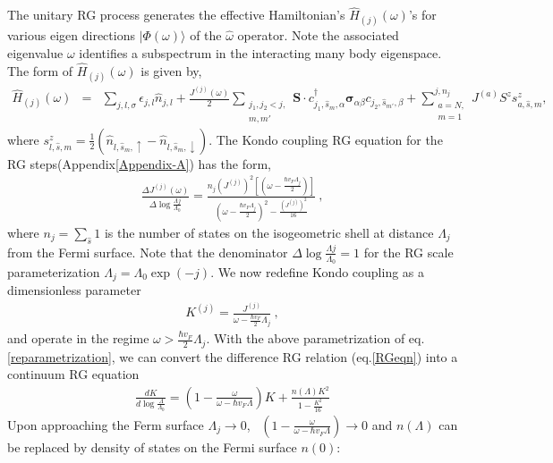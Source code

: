 \documentclass[aps,prb,preprint,groupedaddress]{revtex4-2}
\begin{document}
The unitary RG process generates the effective Hamiltonian's $\hat{H}_{(j)}(\omega)$'s for various eigen directions $|\Phi(\omega)\rangle$
of the $\hat{\omega}$ operator. Note the associated eigenvalue $\omega$ identifies a subspectrum in the interacting many body eigenspace. The form of $\hat{H}_{(j)}(\omega)$ is given by,
\begin{eqnarray}
\hat{H}_{(j)}(\omega) &=& \sum_{j,l,\sigma}\epsilon_{j,l}\hat{n}_{j,l}+\frac{J^{(j)}(\omega)}{2}\sum_{\substack{j_{1},j_{2}<j,\\ m,m'}}\mathbf{S}\cdot c^{\dagger}_{j_{1},\hat{s}_{m},\alpha}\boldsymbol{\sigma}_{\alpha\beta}c_{j_{2},\hat{s}_{m'},\beta}+\sum^{j,n_{j}}_{\substack{a=N,\\ m=1}}J^{(a)}S^{z}s^{z}_{a,\hat{s},m},
\end{eqnarray}
where  $s^{z}_{l,\hat{s},m}=\frac{1}{2}(\hat{n}_{l,\hat{s}_{m},\uparrow}-\hat{n}_{l,\hat{s}_{m},\downarrow})$. The Kondo coupling RG equation for the RG steps(Appendix\ref{Appendix-A}) has the form,
\begin{eqnarray}
\frac{\Delta J^{(j)}(\omega)}{\Delta\log\frac{\Lambda{j}}{\Lambda_{0}}}=\frac{n_{j}(J^{(j)})^{2}\left[(\omega - \frac{\hbar v_{F}\Lambda_{j}}{2})\right]}{(\omega - \frac{\hbar v_{F}\Lambda_{j}}{2})^{2}-\frac{\left(J^{(j)}\right)^{2}}{16}}~,\label{RGeqn}
\end{eqnarray}
where $n_{j}=\sum_{\hat{s}}1$ is the number of states on the isogeometric shell at distance $\Lambda_{j}$ from the Fermi surface. Note that the denominator $\Delta\log\frac{\Lambda{j}}{\Lambda_{0}} =1$ for the RG scale parameterization $\Lambda_{j}=\Lambda_{0}\exp(-j)$. We now redefine Kondo coupling as a dimensionless parameter
\begin{eqnarray}
K^{(j)}=\frac{J^{(j)}}{\omega-\frac{\hbar v_{F}}{2}\Lambda_{j}}~,\label{reparametrization}
\end{eqnarray} 
and operate in the regime $\omega>\frac{\hbar v_{F}}{2}\Lambda_{j}$. 
With the above parametrization of eq.\eqref{reparametrization}, we can convert the difference RG relation (eq.\eqref{RGeqn}) into a continuum RG equation
\begin{eqnarray}
\frac{d K}{d\log\frac{\Lambda}{\Lambda_{0}}}=\left(1-\frac{\omega}{\omega-\hbar v_{F}\Lambda}\right)K+\frac{n(\Lambda)K^{2}}{1-\frac{K^{2}}{16}}
\end{eqnarray}
Upon approaching the Ferm surface $\Lambda_{j}\to 0$,~ $\left(1-\frac{\omega}{\omega-\hbar v_{F}\Lambda}\right)\to 0$ and $n(\Lambda)$ can be replaced by density of states on the Fermi surface $n(0)$:
\end{document}
